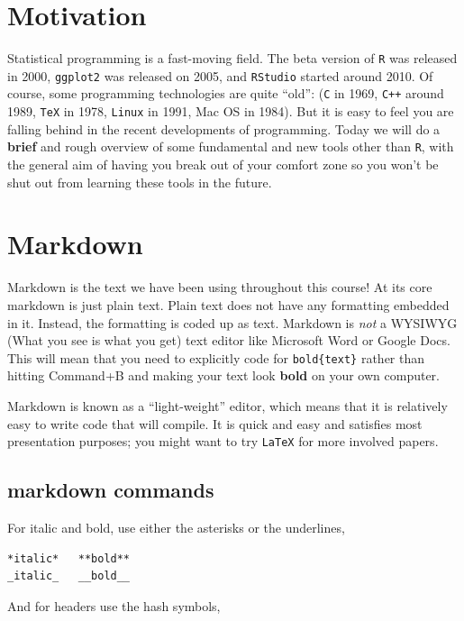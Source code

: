 \documentclass[]{book}
\theoremstyle{definition}
\theoremstyle{definition}
\theoremstyle{definition}
\theoremstyle{remark}
\begin{document}
\section{Motivation}\label{motivation-2}

Statistical programming is a fast-moving field. The beta version of
\texttt{R} was released in 2000, \texttt{ggplot2} was released on 2005,
and \texttt{RStudio} started around 2010. Of course, some programming
technologies are quite ``old'': (\texttt{C} in 1969, \texttt{C++} around
1989, \texttt{TeX} in 1978, \texttt{Linux} in 1991, Mac OS in 1984). But
it is easy to feel you are falling behind in the recent developments of
programming. Today we will do a \textbf{brief} and rough overview of
some fundamental and new tools other than \texttt{R}, with the general
aim of having you break out of your comfort zone so you won't be shut
out from learning these tools in the future.

\section{Markdown}\label{markdown}

Markdown is the text we have been using throughout this course! At its
core markdown is just plain text. Plain text does not have any
formatting embedded in it. Instead, the formatting is coded up as text.
Markdown is \emph{not} a WYSIWYG (What you see is what you get) text
editor like Microsoft Word or Google Docs. This will mean that you need
to explicitly code for \texttt{bold\{text\}} rather than hitting
Command+B and making your text look \textbf{bold} on your own computer.

Markdown is known as a ``light-weight'' editor, which means that it is
relatively easy to write code that will compile. It is quick and easy
and satisfies most presentation purposes; you might want to try
\texttt{LaTeX} for more involved papers.

\subsection{markdown commands}\label{markdown-commands}

For italic and bold, use either the asterisks or the underlines,

\begin{verbatim}
*italic*   **bold**
_italic_   __bold__
\end{verbatim}

And for headers use the hash symbols,
\end{document}
